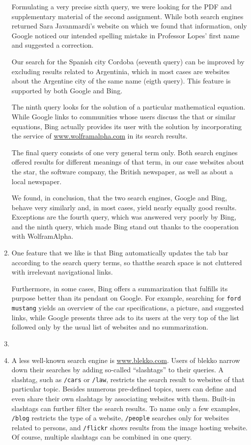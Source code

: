 \documentclass[a4paper,11pt,oneside]{book}
\begin{document}
\begin{enumerate}
				Formulating a very precise sixth query, we were looking for the PDF and supplementary material of the second assignment. While both search engines returned Sara Javanmardi's website on which we found that information, only Google noticed our intended spelling mistake in Professor Lopes' first name and suggested a correction. 
				
				Our search for the Spanish city Cordoba (seventh query) can be improved by excluding results related to Argentinia, which in most cases are websites about the Argentine city of the same name (eigth query). This feature is supported by both Google and Bing.
				
				The ninth query looks for the solution of a particular mathematical equation. While Google links to communities whose users discuss the that or similar equations, Bing actually provides its user with the solution by incorporating the service of \url{www.wolframalpha.com} in its search results.
				
				The final query consists of one very general term only. Both search engines offered results for different meanings of that term, in our case websites about the star, the software company, the British newspaper, as well as about a local newspaper.
				
				We found, in conclusion, that the two search engines, Google and Bing, behave very similarly and, in most cases, yield nearly equally good results. Exceptions are the fourth query, which was answered very poorly by Bing, and the ninth query, which made Bing stand out thanks to the cooperation with WolframAlpha.
				
	\item One feature that we like is that Bing automatically updates the tab bar according to the search query  terms, so thatthe search space is not cluttered with irrelevant navigational links. 
	
		Furthermore, in some cases, Bing offers a summarization that fulfills its purpose better than its pendant on Google. For example, searching for \texttt{ford mustang} yields an overview of the car specifications, a picture, and suggested links, while Google presents three ads to its users at the very top of the list followed only by the usual list of websites and no summarization.
	\item
	\item A less well-known search engine is \url{www.blekko.com}. Users of blekko narrow down their searches by adding so-called ``slashtags'' to their queries. A slashtag, such as \texttt{/cars} or \texttt{/law}, restricts the search result to websites of that particular topic. Besides numerous pre-defined topics, users can define and even share their own slashtags by associating websites with them. Built-in slashtags can further filter the search results. To name only a few examples, \texttt{/blog} restricts the type of a website, \texttt{/people} searches only for websites related to persons, and \texttt{/flickr} shows results from the image hosting website. Of course, multiple slashtags can be combined in one query.
	

\end{enumerate}
\end{document}
